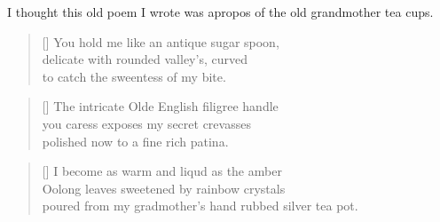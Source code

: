 I thought this old poem I wrote was apropos of the old grandmother tea cups.

\settowidth{\versewidth}{Oolong leaves sweetened by rainbow crystals}
\begin{verse}[\versewidth]
You hold me like an antique sugar spoon,\\
delicate with rounded valley's, curved\\
to catch the sweentess of my bite.
\end{verse}
\begin{verse}[\versewidth]
The intricate Olde English filigree handle\\
you caress exposes my secret crevasses\\
polished now to a fine rich patina.
\end{verse}
\begin{verse}[\versewidth]
I become as warm and liqud as the amber\\
Oolong leaves sweetened by rainbow crystals\\
poured from my gradmother's hand rubbed silver tea pot.
\end{verse}
